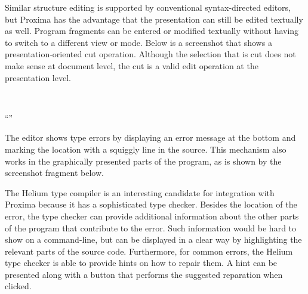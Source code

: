 Similar structure editing is supported by conventional syntax-directed editors, but Proxima has the advantage that the presentation can still be edited textually as well. Program fragments can be entered or modified textually without having to switch to a different view or mode.  Below is a screenshot that shows a presentation-oriented cut operation. Although the selection that is cut does not make sense at document level, the cut is a valid edit operation at the presentation level.

\begin{center}
 \then
\nopagebreak[4] \\ [2mm]
\begin{small}
\hspace*{1.00cm}{\em cut} ``''
\end{small}
\end{center}



The editor shows type errors by displaying an error message at the bottom and marking the location with a squiggly line in the source. This mechanism also works in the graphically presented parts of the program, as is shown by the screenshot fragment below.


The Helium type compiler is an interesting candidate for integration with Proxima because it has a sophisticated type checker. Besides the location of the error, the type checker can provide additional information about the other parts of the program that contribute to the error. Such information would be hard to show on a command-line, but can be displayed in a clear way by highlighting the relevant parts of the source code. Furthermore, for common errors, the Helium type checker is able to provide hints on how to repair them. A hint can be presented along with a button that performs the suggested reparation when clicked.




